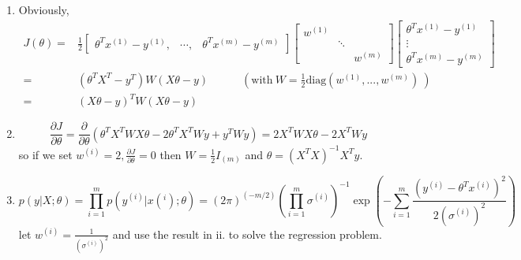 \begin{answer}
    \begin{enumerate}
    	\item
    	    	Obviously,
\begin{align*}
J(\theta) =& \frac{1}{2} 	\begin{bmatrix}
\theta^Tx^{(1)}-y^{(1)}, & \cdots, & \theta^Tx^{(m)}-y^{(m)}
\end{bmatrix} \begin{bmatrix}
w^{(1)}& & \\
& \ddots &\\
& & w^{(m)}
\end{bmatrix}\begin{bmatrix}
\theta^Tx^{(1)}-y^{(1)}\\
\vdots\\
\theta^Tx^{(m)}-y^{(m)}
\end{bmatrix}\\
= &(\theta^TX^T-y^T)W(X\theta -y) \qquad \quad(\mbox{with}\  W = \frac{1}{2}
\mbox{diag}(w^{(1)},...,w^{(m)})\ )\\
= &(X\theta-y)^TW(X\theta-y)
\end{align*}
\item
\[ \frac{\partial J}{\partial \theta}=\frac{\partial }{\partial \theta}(\theta^TX^TWX\theta-2\theta^TX^TWy+y^TWy)=2X^TWX\theta-2X^TWy \]
so if we set $ w^{(i)}=2,\frac{\partial J}{\partial \theta}=0 $ then $ W=\frac{1}{2}I_{(m)}$ and $ \theta=(X^TX)^{-1}X^T{y}. $
\item
\[ p(y|X;\theta) = \prod_{i=1}^{m}p(y^{(i)}|x(^{i});\theta) = (2\pi)^{(-m/2)}(\prod_{i=1}^{m}\sigma^{(i)})^{-1}\exp\left( -\sum_{i=1}^{m}\frac{(y^{(i)}-\theta^Tx^{(i)})^2}{2(\sigma^{(i)})^2}\right)  \]
let $ w^{(i)} = \frac{1}{(\sigma^{(i)})^2}  $ and use the result in ii. to solve the regression problem.
    \end{enumerate}

\end{answer}
